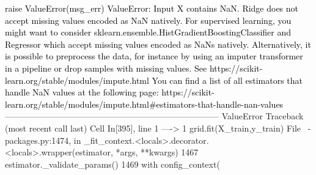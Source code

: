 \documentclass[
  letterpaper,
  DIV=11,
  numbers=noendperiod]{scrartcl}
\begin{document}
\begin{Highlighting}
\textcolor{black}{    raise ValueError(msg_err)}
\textcolor{black}{ValueError: Input X contains NaN.}
\textcolor{black}{Ridge does not accept missing values encoded as NaN natively. For supervised learning, you might want to consider sklearn.ensemble.HistGradientBoostingClassifier and Regressor which accept missing values encoded as NaNs natively. Alternatively, it is possible to preprocess the data, for instance by using an imputer transformer in a pipeline or drop samples with missing values. See https://scikit-learn.org/stable/modules/impute.html You can find a list of all estimators that handle NaN values at the following page: https://scikit-learn.org/stable/modules/impute.html#estimators-that-handle-nan-values}
\textcolor{black}{}\textcolor{QuartoInternalColor1}{---------------------------------------------------------------------------}\textcolor{QuartoInternalColor2}{}
\textcolor{QuartoInternalColor2}{}\textcolor{QuartoInternalColor1}{ValueError}\textcolor{QuartoInternalColor2}{                                Traceback (most recent call last)}
\textcolor{QuartoInternalColor2}{Cell }\textcolor{QuartoInternalColor3}{In[395], line 1}\textcolor{QuartoInternalColor2}{}
\textcolor{QuartoInternalColor2}{}\textcolor{QuartoInternalColor3}{----> 1}\textcolor{QuartoInternalColor2}{ }\textcolor{QuartoInternalColor2}{grid}\textcolor{QuartoInternalColor2}{}\textcolor{QuartoInternalColor4}{.}\textcolor{QuartoInternalColor2}{}\textcolor{QuartoInternalColor2}{fit}\textcolor{QuartoInternalColor2}{}\textcolor{QuartoInternalColor2}{(}\textcolor{QuartoInternalColor2}{}\textcolor{QuartoInternalColor2}{X_train}\textcolor{QuartoInternalColor2}{}\textcolor{QuartoInternalColor2}{,}\textcolor{QuartoInternalColor2}{}\textcolor{QuartoInternalColor2}{y_train}\textcolor{QuartoInternalColor2}{}\textcolor{QuartoInternalColor2}{)}\textcolor{QuartoInternalColor2}{}
\textcolor{QuartoInternalColor2}{File }\textcolor{QuartoInternalColor3}{~\Lib\site-packages\sklearn\base.py:1474}\textcolor{QuartoInternalColor2}{, in }\textcolor{QuartoInternalColor5}{_fit_context.<locals>.decorator.<locals>.wrapper}\textcolor{QuartoInternalColor6}{(estimator, *args, **kwargs)}\textcolor{QuartoInternalColor2}{}
\textcolor{QuartoInternalColor2}{}\textcolor{QuartoInternalColor7}{   1467}\textcolor{QuartoInternalColor2}{     estimator}\textcolor{QuartoInternalColor4}{.}\textcolor{QuartoInternalColor2}{_validate_params()}
\textcolor{QuartoInternalColor2}{}\textcolor{QuartoInternalColor7}{   1469}\textcolor{QuartoInternalColor2}{ }\textcolor{QuartoInternalColor8}{with}\textcolor{QuartoInternalColor2}{ config_context(}

\end{Highlighting}
\end{document}
